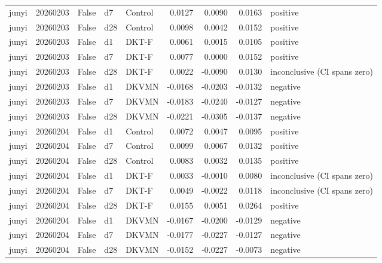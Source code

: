\begin{tabular}{lrrllrrrl}
junyi & 20260203 & False & d7 & Control & 0.0127 & 0.0090 & 0.0163 & positive \\
junyi & 20260203 & False & d28 & Control & 0.0098 & 0.0042 & 0.0152 & positive \\
junyi & 20260203 & False & d1 & DKT-F & 0.0061 & 0.0015 & 0.0105 & positive \\
junyi & 20260203 & False & d7 & DKT-F & 0.0077 & 0.0000 & 0.0152 & positive \\
junyi & 20260203 & False & d28 & DKT-F & 0.0022 & -0.0090 & 0.0130 & inconclusive (CI spans zero) \\
junyi & 20260203 & False & d1 & DKVMN & -0.0168 & -0.0203 & -0.0132 & negative \\
junyi & 20260203 & False & d7 & DKVMN & -0.0183 & -0.0240 & -0.0127 & negative \\
junyi & 20260203 & False & d28 & DKVMN & -0.0221 & -0.0305 & -0.0137 & negative \\
junyi & 20260204 & False & d1 & Control & 0.0072 & 0.0047 & 0.0095 & positive \\
junyi & 20260204 & False & d7 & Control & 0.0099 & 0.0067 & 0.0132 & positive \\
junyi & 20260204 & False & d28 & Control & 0.0083 & 0.0032 & 0.0135 & positive \\
junyi & 20260204 & False & d1 & DKT-F & 0.0033 & -0.0010 & 0.0080 & inconclusive (CI spans zero) \\
junyi & 20260204 & False & d7 & DKT-F & 0.0049 & -0.0022 & 0.0118 & inconclusive (CI spans zero) \\
junyi & 20260204 & False & d28 & DKT-F & 0.0155 & 0.0051 & 0.0264 & positive \\
junyi & 20260204 & False & d1 & DKVMN & -0.0167 & -0.0200 & -0.0129 & negative \\
junyi & 20260204 & False & d7 & DKVMN & -0.0177 & -0.0227 & -0.0127 & negative \\
junyi & 20260204 & False & d28 & DKVMN & -0.0152 & -0.0227 & -0.0073 & negative \\
\bottomrule
\end{tabular}
